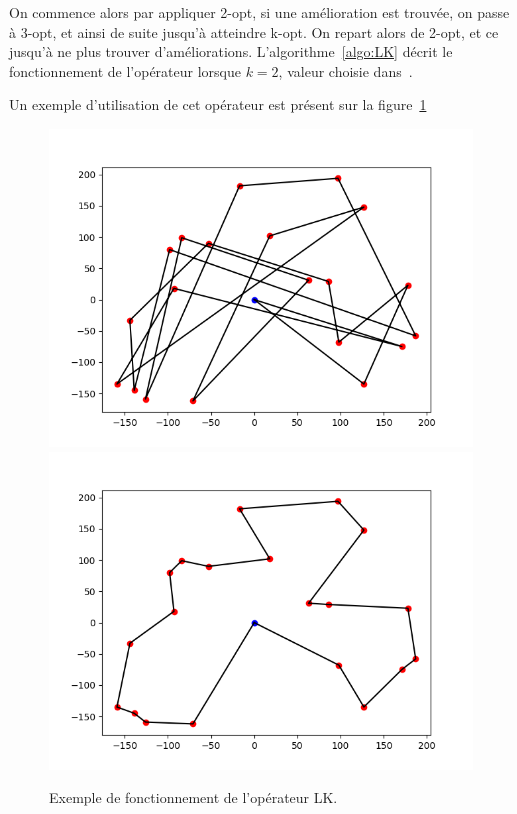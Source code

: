 \documentclass[a4paper,11pt]{article}%
\begin{document}
On commence alors par appliquer 2-opt, si une amélioration est trouvée, on passe à 3-opt, et ainsi de suite jusqu'à atteindre k-opt. 
On repart alors de 2-opt, et ce jusqu'à ne plus trouver d'améliorations. L'algorithme~\ref{algo:LK} décrit le fonctionnement de l'opérateur lorsque $ k = 2$, valeur choisie dans~\cite{Sorensen_2017}.
 
Un exemple d'utilisation de cet opérateur est présent sur la figure~\ref{LK}

\begin{figure}[h]
\centering
\includegraphics[scale=0.4]{test4_20_init.png}
\includegraphics[scale=0.4]{test4_20_LKopt.png}

\caption{Exemple de fonctionnement de l'opérateur LK.}
\label{LK}
\end{figure}
\end{document}
